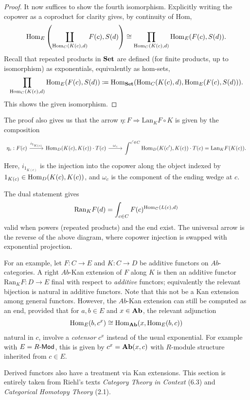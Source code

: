 \begin{proof}
	It now suffices to show the fourth isomorphism. Explicitly writing the copower as a coproduct for clarity gives, by continuity of Hom,
	\[
		\operatorname{Hom}_{E}\left( \coprod_{\operatorname{Hom}_{C}(K(c), d) } F(c),S(d) \right) \cong \prod_{\operatorname{Hom}_{C}(K(c), d) } \operatorname{Hom}_{E}(F(c), S(d))
	.\]
	Recall that repeated products in $\mathbf{Set} $ are defined (for finite products, up to isomorphism) as exponentials, equivalently as hom-sets,
	\[
		\prod_{\operatorname{Hom}_{C}(K(c), d) } \operatorname{Hom}_{E}(F(c), S(d)) \coloneqq \operatorname{Hom}_{\mathbf{Set} }(\operatorname{Hom}_{C}(K(c), d) , \operatorname{Hom}_{E}(F(c), S(d)) ) 
	.\]
	This shows the given isomorphism.
\end{proof}

The proof also gives us that the arrow $\eta : F \Rightarrow \mathrm{Lan} _KF\circ K$ is given by the composition
\[\begin{tikzcd}[row sep = 2.5em, column sep = 2.5em]
	\eta_c : F(c)\ar[" i_{1_{K(c)} }  ", r]  & \Hom_{D}(K(c), K(c)) \cdot T(c)\ar[" \omega_{c}  ", r]  & \displaystyle{\int^{c'\in C} \Hom_{D}(K(c'), K(c)) \cdot T(c)=\mathrm{Lan} _KF(K(c)).}
\end{tikzcd}\]
Here, $i_{1_{K(c)} } $ is the injection into the copower along the object indexed by $1_{K(c)} \in \operatorname{Hom}_{D}(K(c), K(c)) $, and $\omega_{c} $ is the component of the ending wedge at $c$.

The dual statement gives
\[
	\mathrm{Ran} _KF(d)=\int_{c\in C} F(c)^{\operatorname{Hom}_{C}(L(c), d) } 
\]
valid when powers (repeated products) and the end exist. The universal arrow is the reverse of the above diagram, where copower injection is swapped with exponential projection.

For an example, let $F : C \to E$ and $K : C \to D$ be additive functors on $Ab$-categories. A right $Ab$-Kan extension of $F$ along $K$ is then an additive functor $\mathrm{Ran} _KF : D \to E$ final with respect to \emph{additive} functors; equivalently the relevant bijection is natural in additive functors. Note that this not be a Kan extension among general functors. However, the $Ab$-Kan extension can still be computed as an end, provided that for $a,b\in E$ and $x\in\mathbf{Ab}$, the relevant adjunction
\[
	\operatorname{Hom}_{E}(b, c^x) \cong \operatorname{Hom}_{\mathbf{Ab}}(x, \operatorname{Hom}_{E}(b, c) ) 
\]
natural in $c$, involve a \emph{cotensor} $c^x$ instead of the usual exponential. For example with $E=R\text{-}\mathsf{Mod} $, this is given by $c^x=\mathbf{Ab}(x,c)$ with $R$-module structure inherited from $c\in E$.

Derived functors also have a treatment via Kan extensions. This section is entirely taken from Riehl's texts \emph{Category Theory in Context} (6.3) and \emph{Categorical Homotopy Theory} (2.1).

